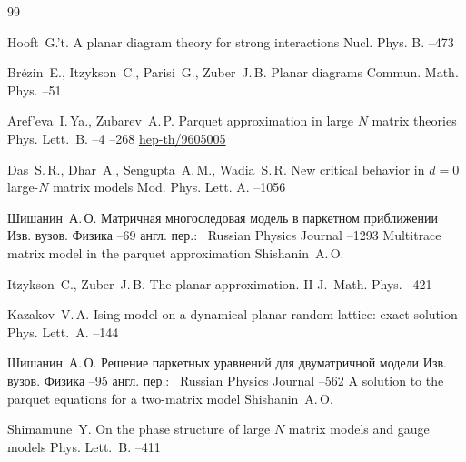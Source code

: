 \begin{thebibliography}{99}

\by Hooft~G.'t.
\paper  A planar diagram theory for strong interactions 
\jour Nucl. Phys. B.
--473 




\by Br\'ezin~E., Itzykson~C., Parisi~G., Zuber~J.\,B.
\paper Planar diagrams
\jour Commun. Math. Phys.
--51



\by Aref'eva~I.\,Ya., Zubarev~A.\,P.
\paper  Parquet approximation in large $N$ matrix theories
\jour Phys. Lett.~B.
--4
--268 
\arxiv \href{http://arxiv.org/abs/hep-th/9605005}{hep-th/9605005} 


\by Das~S.\,R., Dhar~A., Sengupta~A.\,M., Wadia~S.\,R.
\paper  New critical behavior in $d=0$ large-$N$ matrix models
\jour Mod. Phys. Lett. A.
--1056

\by Шишанин~А.\,О.
\paper  Матричная многоследовая модель в паркетном приближении
\jour Изв. вузов. Физика
--69
\transl англ. пер.:~
\jour Russian Physics Journal
--1293
\paper Multitrace matrix model in the parquet approximation
\by Shishanin~A.\,O. 


\by Itzykson~C., Zuber~J.\,B.
\paper The planar approximation. {\rm II}
\jour J.~Math. Phys.
--421 




\by Kazakov~V.\,A.
\paper Ising model on a dynamical planar random lattice: exact solution
\jour Phys. Lett.~A.
--144


\by Шишанин~А.\,О.
\paper Решение паркетных уравнений для двуматричной модели
\jour Изв. вузов. Физика
--95
\transl англ. пер.:~
\jour Russian Physics Journal
--562
\paper A solution to the parquet equations for a two-matrix model
\by Shishanin~A.\,O. 


\by Shimamune~Y.
\paper On the phase structure of large $N$ matrix models and gauge models
\jour Phys. Lett.~B.
--411


\end{thebibliography}
